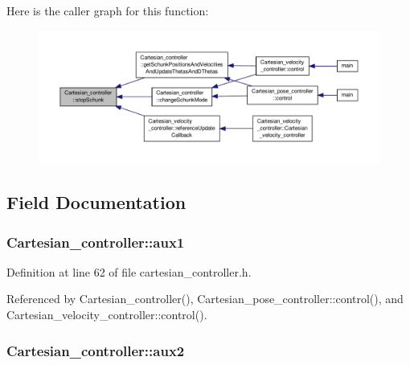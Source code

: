 Here is the caller graph for this function\-:\nopagebreak
\begin{figure}[H]
\begin{center}
\leavevmode
\includegraphics[width=350pt]{classCartesian__controller_a3ba54e8b35632526c5e8eb2ab5d7de0d_icgraph}
\end{center}
\end{figure}




\subsection{Field Documentation}
\hypertarget{classCartesian__controller_a37edb9c6e2a5066f74941e3659f68cbc}{
\subsubsection[{aux1}]{ Cartesian\-\_\-controller\-::aux1\hspace{0.3cm}{\ttfamily [protected]}}}\label{classCartesian__controller_a37edb9c6e2a5066f74941e3659f68cbc}


Definition at line 62 of file cartesian\-\_\-controller.\-h.



Referenced by Cartesian\-\_\-controller(), Cartesian\-\_\-pose\-\_\-controller\-::control(), and Cartesian\-\_\-velocity\-\_\-controller\-::control().

\hypertarget{classCartesian__controller_af73a0c910cd80ed2f84974b65beba450}{
\subsubsection[{aux2}]{ Cartesian\-\_\-controller\-::aux2\hspace{0.3cm}{\ttfamily [protected]}}}\label{classCartesian__controller_af73a0c910cd80ed2f84974b65beba450}


